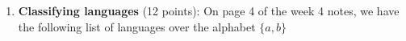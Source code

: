 \documentclass[12pt, oneside]{article}
\newcommand{\gradeCorrect}{({\it Graded for correctness}) }
\begin{document}
\begin{enumerate}[wide, labelwidth=!, labelindent=0pt]
\begin{comment}
Briefly justify why your solution for each part works by giving plain English descriptions of the language 
described by the regular expression and of its complement and connecting them to the regular 
expression via relevant definitions. An English description that is more 
detailed than simply negating the description in the original language will likely be helpful in the justification.

Alternatively, you can justify your solution by first designing a DFA that recognizes $L(R)$, 
using the construction from class and the book to modify this DFA to get a new DFA that recognizes~$\overline{L(R)}$, 
and then applying the constructions from class and the book to convert this new DFA to a regular expression.

For each part of the question, clearly state which approach you're taking and include enough intermediate
steps to illustrate your work.


\begin{enumerate}
    \item\gradeCorrect $a^*b^*$
    \item\gradeCorrect $(a \cup b) a b^*$
\end{enumerate}
\end{comment}

\item\textbf{Classifying languages} (12 points):
On page 4 of the week 4 notes, we have the following list of languages over the alphabet $\{a,b\}$


\end{enumerate}
\end{document}
